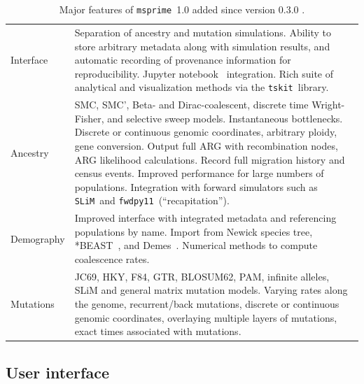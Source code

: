 \documentclass[9pt,twocolumn,twoside,lineno]{gsajnl}
\newcommand{\msprime}[0]{\texttt{msprime}}
\newcommand{\tskit}[0]{\texttt{tskit}}
\newcommand{\SLiM}[0]{\texttt{SLiM}}
\newcommand{\fwdpy}[0]{\texttt{fwdpy11}}
\begin{document}
\begin{table}
\small{
{ %
\renewcommand{\arraystretch}{1.5}
\begin{tabular}{lp{6.5cm}}
Interface
& Separation of ancestry and mutation simulations.
Ability to store arbitrary metadata along with simulation
results, and automatic recording of provenance information
for reproducibility.
Jupyter notebook~\citep{kluyver2016jupyter} integration.
Rich suite of analytical and visualization methods via the \tskit\ library. \\

Ancestry
& SMC, SMC', Beta- and Dirac-coalescent, discrete time Wright-Fisher,
and selective sweep models. Instantaneous bottlenecks.
Discrete or continuous genomic coordinates, arbitrary ploidy,
gene conversion.
Output full ARG with recombination nodes, ARG likelihood calculations.
Record full migration history and census
events.  Improved performance for large numbers of populations.
Integration with forward simulators such as \SLiM\ and \fwdpy\
(``recapitation'').
\\

Demography
&
Improved interface with integrated metadata and referencing populations by
name. Import from Newick species tree, *BEAST~\citep{heled2009bayesian},
and Demes~\citep{gower2021demes}. Numerical methods to compute
coalescence rates.\\

Mutations
& JC69, HKY, F84, GTR, BLOSUM62, PAM, infinite alleles, SLiM and
general matrix mutation models.
Varying rates along the genome, recurrent/back mutations,
discrete or continuous genomic coordinates, overlaying multiple layers
of mutations, exact times associated with mutations.

\end{tabular}
}
}
\caption{\label{tab-v1-summary}Major features
of \msprime\ 1.0 added since version 0.3.0 \citep{kelleher2016efficient}.}
\end{table}

\subsection*{User interface}
\label{sec-sim-interface}
\end{document}
